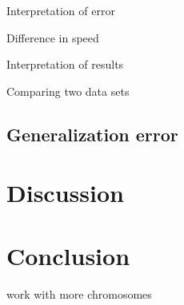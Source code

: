 \documentclass{article} %
\begin{document}
Interpretation of error

Difference in speed

Interpretation of results

Comparing two data sets

\subsection{Generalization error}



\section{Discussion}



\section{Conclusion}
work with more chromosomes



\end{document}
